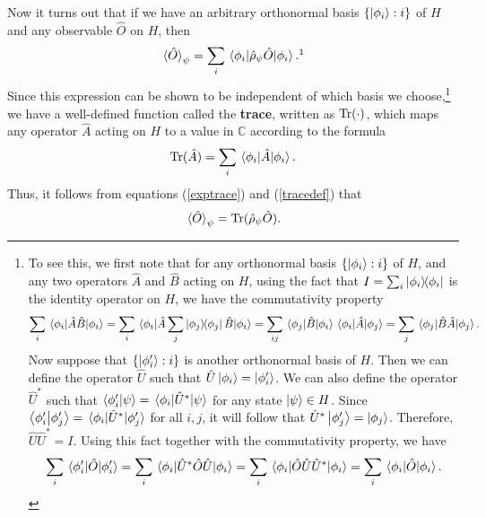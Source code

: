       Now it turns out that if we have an arbitrary orthonormal basis $\{\ket{\phi_i}:i\}$ of $H$ and any observable $\hat{O}$ on $H$, then 
    \begin{equation}\label{exptrace}\ev*{\hat{O}}_\psi=\sum_{i}\ev*{\hat{\rho}_\psi\hat{O}}{\phi_i}.\protect\footnotemark
    \end{equation}
    Since this expression can be shown to be independent of
     which basis we choose,\footnote{To see this, we first note that for any orthonormal basis $\{\ket{\phi_i}:i\}$ of $H$, and any two operators $\hat{A}$ and $\hat{B}$ acting on $H$, using the fact that $I=\sum_i\dyad{\phi_i}$ is the identity operator on $H$, we have the commutativity property $$\sum_i\ev*{\hat{A}\hat{B}}{\phi_i}=\sum_i\ev*{\hat{A}\sum_j\dyad{\phi_j}\hat{B}}{\phi_i}=\sum_{ij}\mel*{\phi_j}{\hat{B}}{\phi_i}\mel*{\phi_i}{\hat{A}}{\phi_j}=\sum_j\ev*{\hat{B}\hat{A}}{\phi_j}.$$ Now suppose that $\{\ket{\phi_i'}:i\}$  is another orthonormal basis of $H$. Then we can define the operator $\hat{U}$ such that $\hat{U}\ket{\phi_i}=\ket{\phi_i'}$. We can also define the operator $\hat{U}^*$ such that $\ip{\phi_i'}{\psi}=\mel*{\phi_i}{\hat{U}^*}{\psi}$ for any state $\ket{\psi}\in H$. Since $\ip{\phi_i'}{\phi_j'}=\mel*{\phi_i}{\hat{U}^*}{\phi_j'}$ for all $i, j$, it will follow that  $\hat{U}^*\ket{\phi_j'}=\ket{\phi_j}$. Therefore, $\hat{U}\hat{U}^*=I$. Using this fact together with the commutativity property, we have 
    $$\sum_i \ev*{\hat{O}}{\phi_i'}= \sum_i\ev*{\hat{U}^*\hat{O}\hat{U}}{\phi_i}
    =\sum_i\ev*{\hat{O}\hat{U}\hat{U}^*}{\phi_i}=\sum_i\ev*{\hat{O}}{\phi_i}.$$} 
     we have a well-defined function called the \textbf{trace}, written as $\operatorname{Tr}(\cdot)$, which maps any operator $\hat{A}$ acting on $H$ to a value in $\mathbb{C}$ according to the formula
    \begin{equation}\Tr (\hat{A})=\sum_i \ev*{\hat{A}}{\phi_i}.\label{tracedef}\end{equation}
    Thus, it follows from equations (\ref{exptrace}) and (\ref{tracedef}) that 
    \begin{equation}
    \ev*{\hat{O}}_\psi=\Tr (\hat{\rho}_\psi\hat{O}\label{traceev}).
    \end{equation}
